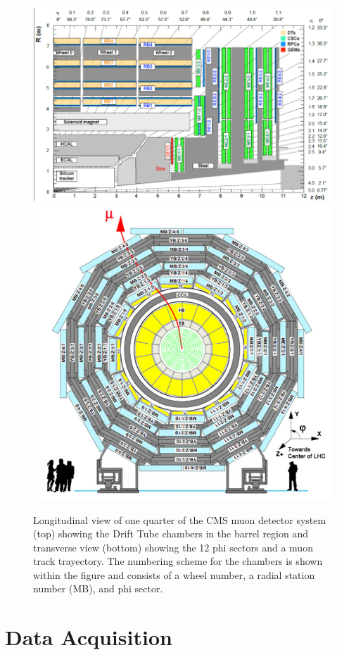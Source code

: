 \begin{figure}[hbtp]
\centering
\includegraphics[width=.8\linewidth]{tex/Part2/fig/DT/DT-longitudinal.png}
\includegraphics[width=.7\linewidth]{tex/Part2/fig/DT/DT-transverse.png}
\caption{
  Longitudinal view of one quarter of the CMS muon detector system (top) showing the Drift Tube chambers in the barrel region
  and transverse view (bottom) showing the 12 phi sectors and a muon track trayectory.
  The numbering scheme for the chambers is shown within the figure and consists of a wheel number, a radial station number (MB), and phi sector.
}
\label{fig:DT_layout}
\end{figure}

\clearpage

\section{Data Acquisition}

